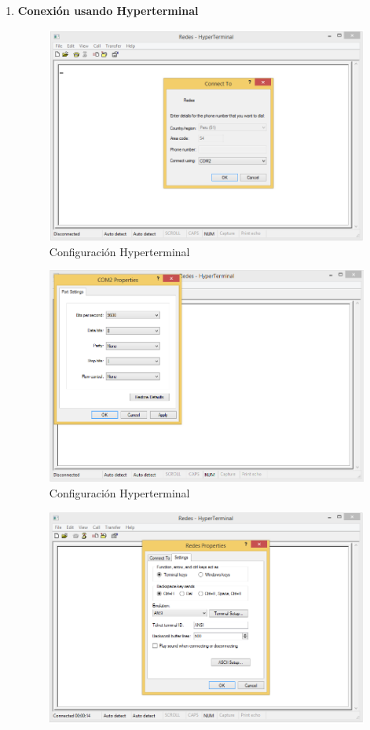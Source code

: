 \documentclass[a4paper,12pt]{article}
\begin{document}
\begin{enumerate}
 \item \textbf{Conexión usando Hyperterminal}
 \begin{figure}[H]
  \centering
  \includegraphics[scale = 0.5]{3.png}
  \caption{Configuración Hyperterminal}
 \end{figure}
 \begin{figure}[H]
  \centering
  \includegraphics[scale = 0.5]{4.png}
  \caption{Configuración Hyperterminal}
 \end{figure}
 \begin{figure}[H]
  \centering
  \includegraphics[scale = 0.5]{5.png}

\end{figure}
\end{enumerate}
\end{document}
